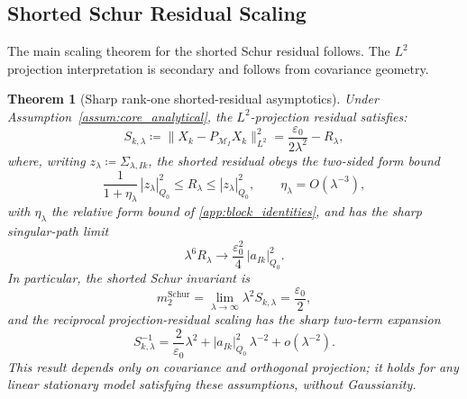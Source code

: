 \documentclass[preprint,12pt]{elsarticle}
\theoremstyle{plain}
\newtheorem{theorem}{Theorem}
\theoremstyle{definition}
\theoremstyle{remark}
\begin{document}
    \subsection{Shorted Schur Residual Scaling}
    \label{sec:infdim:scaling}

    The main scaling theorem for the shorted Schur residual follows. The $L^2$ projection interpretation is secondary and follows from covariance geometry.

    \begin{theorem}[Sharp rank-one shorted-residual asymptotics]
        \label{thm:inf_cancellation}
        Under Assumption~\ref{assum:core_analytical}, the $L^2$-projection residual satisfies:
        \begin{equation}
            \label{eq:main_schur_sharp}
            S_{k,\lambda} \coloneqq \|X_k - P_{\mathcal{M}_I} X_k\|_{L^2}^2 = \frac{\varepsilon_0}{2\lambda^2} - R_\lambda,
        \end{equation}
        where, writing $z_\lambda\coloneqq\Sigma_{\lambda,Ik}$, the shorted residual
        obeys the two-sided form bound
        \begin{equation}
            \label{eq:shorted_residual_two_sided}
            \frac{1}{1+\eta_\lambda}\,|z_\lambda|_{Q_0}^2
            \le R_\lambda \le |z_\lambda|_{Q_0}^2,
            \qquad \eta_\lambda=O(\lambda^{-3}),
        \end{equation}
        with $\eta_\lambda$ the relative form bound of
        \ref{app:block_identities}, and has the sharp singular-path limit
        \begin{equation}
            \label{eq:sharp_residual_limit}
            \lambda^6 R_\lambda \longrightarrow \frac{\varepsilon_0^2}{4}\,|a_{Ik}|_{Q_0}^2.
        \end{equation}
        In particular, the shorted Schur invariant is
        \begin{equation}
            \label{eq:m2_schur_value}
            m_2^{\mathrm{Schur}} = \lim_{\lambda\to\infty} \lambda^2 S_{k,\lambda} = \frac{\varepsilon_0}{2},
        \end{equation}
        and the reciprocal projection-residual scaling has the sharp two-term
        expansion
        \begin{equation}
            \label{eq:schur_scaling_inverse}
            S_{k,\lambda}^{-1} = \frac{2}{\varepsilon_0}\lambda^2
            + |a_{Ik}|_{Q_0}^2\,\lambda^{-2} + o(\lambda^{-2}).
        \end{equation}
        This result depends only on covariance and orthogonal projection; it holds for any linear stationary model satisfying these assumptions, without Gaussianity.
    \end{theorem}
\end{document}
